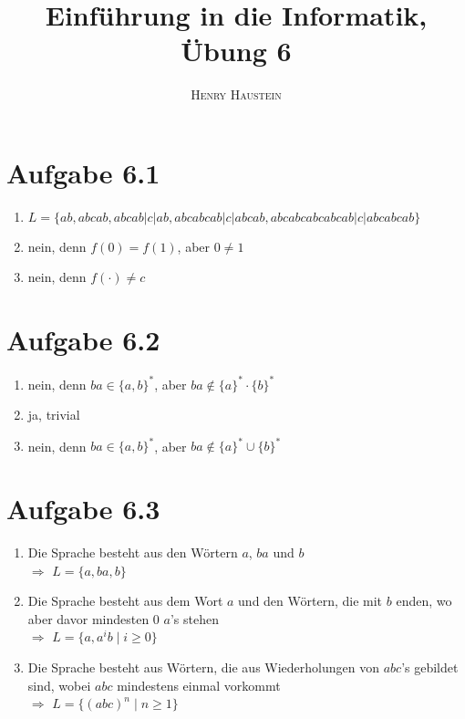 \documentclass{article}
\title{\textbf{Einführung in die Informatik, Übung 6}}
\author{\textsc{Henry Haustein}}
\date{}
\begin{document}
	\maketitle
	
	\section*{Aufgabe 6.1}
	
	\begin{enumerate}[label=(\alph*)]
		\item $L=\{ab,abcab,abcab\vert c\vert ab,abcabcab\vert c\vert abcab, abcabcabcabcab\vert c\vert abcabcab\}$
		\item nein, denn $f(0)=f(1)$, aber $0\neq 1$
		\item nein, denn $f(\cdot)\neq c$
	\end{enumerate}
	
	\section*{Aufgabe 6.2}
	
	\begin{enumerate}[label=(\alph*)]
		\item nein, denn $ba\in \{a,b\}^\ast$, aber $ba\notin \{a\}^\ast\cdot\{b\}^\ast$
		\item ja, trivial
		\item nein, denn $ba\in \{a,b\}^\ast$, aber $ba\notin \{a\}^\ast\cup\{b\}^\ast$
	\end{enumerate}
	
	\section*{Aufgabe 6.3}
	
	\begin{enumerate}[label=(\alph*)]
		\item Die Sprache besteht aus den Wörtern $a$, $ba$ und $b$ \\
		$\Rightarrow$ $L=\{a,ba,b\}$
		\item Die Sprache besteht aus dem Wort $a$ und den Wörtern, die mit $b$ enden, wo aber davor mindesten 0 $a$'s stehen \\
		$\Rightarrow$ $L=\{a,a^ib\mid i\ge 0\}$
		\item Die Sprache besteht aus Wörtern, die aus Wiederholungen von $abc$'s gebildet sind, wobei $abc$ mindestens einmal vorkommt \\
		$\Rightarrow$ $L=\{(abc)^n\mid n\ge 1\}$
	\end{enumerate}
	
\end{document}
